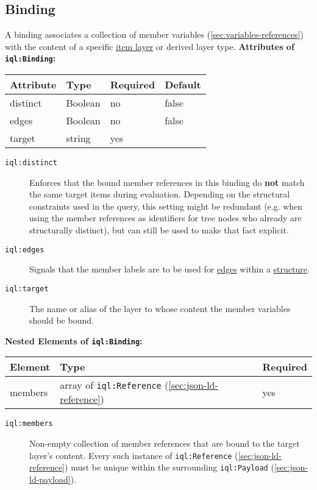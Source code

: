 \documentclass[11pt]{article}
\newcommand{\iqlns}{iql:}
\newcommand{\repoUrl}{https://github.com/ICARUS-tooling/icarus2-modeling-framework/blob/dev/}
\newcommand{\modelsUrl}{\repoUrl icarus2-model-api/src/main/java/de/ims/icarus2/model/api/}
\newcommand{\repoLink}[2]{\href{#1}{#2}}
\newcommand{\iqlType}[1]{\texttt{\iqlns#1}}
\newcommand{\desc}[1]{\noindent#1\newline\medskip}
\newenvironment{attributes}[1]{
\noindent\textbf{Attributes of #1:}\newline\medskip
\begin{tabular}{|p{0.3\textwidth}|p{0.20\textwidth}|p{0.20\textwidth}|p{0.17\textwidth}|}
	\hline
	\textbf{Attribute} & \textbf{Type} & \textbf{Required} & \textbf{Default} \\ 
	\hline
	\hline
}{
\end{tabular}
}
\newcommand{\attribute}[4]{
	#1 & #2 & #3 & #4 \\
	\hline
}
\newenvironment{elements}[1]{
\noindent\textbf{Nested Elements of #1:}\newline\medskip
\begin{tabular}{|p{0.3\textwidth}|p{0.42\textwidth}|p{0.17\textwidth}|}
	\hline
	\textbf{Element} & \textbf{Type} & \textbf{Required} \\ 
	\hline
	\hline
}{
\end{tabular}
}
\newcommand{\element}[3]{
#1 & #2 & #3 \\
\hline
}
\begin{document}
\subsection{Binding}
\label{sec:json-ld-binding}
\desc{A binding associates a collection of member variables (\ref{sec:variables-references}) with the content of a specific \repoLink{\modelsUrl layer/ItemLayer.java}{item layer} or derived layer type.}
\begin{attributes}{\iqlType{Binding}}
	\attribute{distinct}{Boolean}{no}{false}
	\attribute{edges}{Boolean}{no}{false}
	\attribute{target}{string}{yes}{}
\end{attributes}
\begin{description}
	\item[\iqlType{distinct}] Enforces that the bound member references in this binding do \textbf{not} match the same target items during evaluation. Depending on the structural constraints used in the query, this setting might be redundant (e.g. when using the member references as identifiers for tree nodes who already are structurally distinct), but can still be used to make that fact explicit. 
	\item[\iqlType{edges}] Signals that the member labels are to be used for \repoLink{\modelsUrl members/item/Edge.java}{edges} within a \repoLink{\modelsUrl members/structure/Structure.java}{structure}.
	\item[\iqlType{target}] The name or alias of the layer to whose content the member variables should be bound.
\end{description}
\begin{elements}{\iqlType{Binding}}
	\element{members}{array of \iqlType{Reference} (\ref{sec:json-ld-reference})}{yes}
\end{elements}
\begin{description}
	\item[\iqlType{members}] Non-empty collection of member references that are bound to the target layer's content. Every such instance of \iqlType{Reference} (\ref{sec:json-ld-reference}) must be unique within the surrounding \iqlType{Payload} (\ref{sec:json-ld-payload}).
\end{description}
\end{document}
